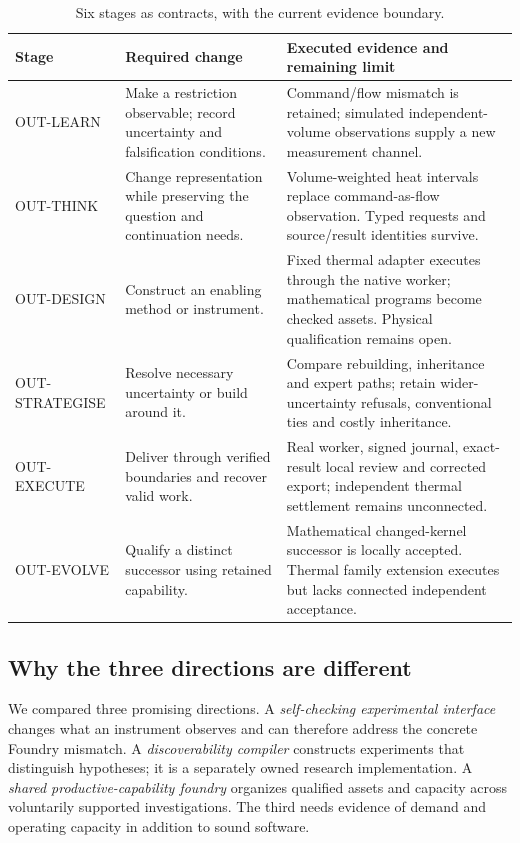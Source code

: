 \documentclass[11pt,a4paper]{article}
\begin{document}
\begin{table}[htbp]
\caption{Six stages as contracts, with the current evidence boundary.}\label{tab:outstages}
\small
\begin{tabularx}{\textwidth}{@{}P{25mm}Y Y@{}}
\toprule
Stage & Required change & Executed evidence and remaining limit\\
\midrule
OUT-LEARN & Make a restriction observable; record uncertainty and falsification conditions. & Command/flow mismatch is retained; simulated independent-volume observations supply a new measurement channel.\\
OUT-THINK & Change representation while preserving the question and continuation needs. & Volume-weighted heat intervals replace command-as-flow observation. Typed requests and source/result identities survive.\\
OUT-DESIGN & Construct an enabling method or instrument. & Fixed thermal adapter executes through the native worker; mathematical programs become checked assets. Physical qualification remains open.\\
OUT-STRATEGISE & Resolve necessary uncertainty or build around it. & Compare rebuilding, inheritance and expert paths; retain wider-uncertainty refusals, conventional ties and costly inheritance.\\
OUT-EXECUTE & Deliver through verified boundaries and recover valid work. & Real worker, signed journal, exact-result local review and corrected export; independent thermal settlement remains unconnected.\\
OUT-EVOLVE & Qualify a distinct successor using retained capability. & Mathematical changed-kernel successor is locally accepted. Thermal family extension executes but lacks connected independent acceptance.\\
\bottomrule
\end{tabularx}
\end{table}

\subsection{Why the three directions are different}
We compared three promising directions. A \emph{self-checking experimental interface} changes what an instrument observes and can therefore address the concrete Foundry mismatch. A \emph{discoverability compiler} constructs experiments that distinguish hypotheses; it is a separately owned research implementation. A \emph{shared productive-capability foundry} organizes qualified assets and capacity across voluntarily supported investigations. The third needs evidence of demand and operating capacity in addition to sound software.
\end{document}
